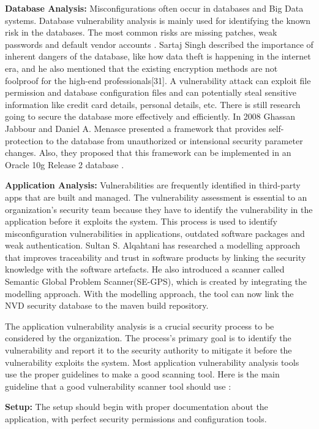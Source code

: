{\bf Database Analysis:} Misconfigurations often occur in databases and Big Data systems. Database vulnerability analysis is mainly used for identifying the known risk in the databases. The most common risks are missing patches, weak passwords and default vendor accounts \cite{Im2021}. Sartaj Singh described the importance of inherent dangers of the database, like how data theft is happening in the internet era, and he also mentioned that the existing encryption methods are not foolproof for the high-end professionals[31]. A vulnerability attack can exploit file permission and database configuration files and can potentially steal sensitive information like credit card details, personal details, etc. There is still research going to secure the database more effectively and efficiently. In 2008 Ghassan Jabbour and Daniel A. Menasce presented a framework that provides self-protection to the database from unauthorized or intensional security parameter changes. Also, they proposed that this framework can be implemented in an Oracle 10g Release 2 database \cite{JaMe2008}.

{\bf Application Analysis:} Vulnerabilities are frequently identified in third-party apps that are built and managed. The vulnerability assessment is essential to an organization’s security team because they have to identify the vulnerability in the application before it exploits the system. This process is used to identify misconfiguration vulnerabilities in applications, outdated software packages and weak authentication. Sultan S. Alqahtani \cite{Al2017} has researched a modelling approach that improves traceability and trust in software products by linking the security knowledge with the software artefacts. He also introduced a scanner called  Semantic Global Problem Scanner(SE-GPS), which is created by integrating the modelling approach. With the modelling approach, the tool can now link the \acs{NVD} \cite{nist} security database to the maven build repository. 

The application vulnerability analysis is a crucial security process to be considered by the organization. The process's primary goal is to identify the vulnerability and report it to the security authority to mitigate it before the vulnerability exploits the system. Most application vulnerability analysis tools use the proper guidelines to make a good scanning tool. Here is the main guideline that a good vulnerability scanner tool should use \cite{Syamini}:

	\textbf{Setup:} The setup should begin with proper documentation about the application, with perfect security permissions and configuration tools.
	

